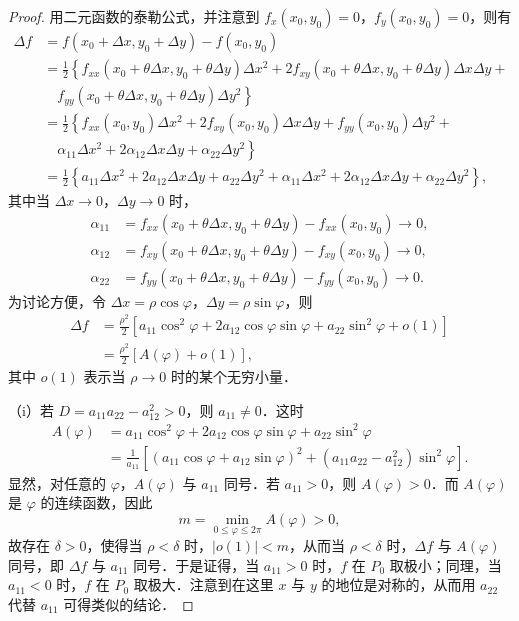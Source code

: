 \begin{proof}
用二元函数的泰勒公式，并注意到 $f_{x}(x_{0},y_{0})=0$，$f_{y}(x_{0},y_{0})=0$，则有
\[
\begin{aligned}
\Delta f&=f(x_{0}+\Delta x,y_{0}+\Delta y)-f(x_{0},y_{0})\\
&=\frac{1}{2}\left\{f_{xx}(x_{0}+\theta\Delta x,y_{0}+\theta\Delta y)\Delta x^{2}+2f_{xy}(x_{0}+\theta\Delta x,y_{0}+\theta\Delta y)\Delta x\Delta y+\right.\\
&\quad\left.f_{yy}(x_{0}+\theta\Delta x,y_{0}+\theta\Delta y)\Delta y^{2}\right\}\\
&=\frac{1}{2}\left\{f_{xx}(x_{0},y_{0})\Delta x^{2}+2f_{xy}(x_{0},y_{0})\Delta x\Delta y+f_{yy}(x_{0},y_{0})\Delta y^{2}+\right.\\
&\quad\left.\alpha_{11}\Delta x^{2}+2\alpha_{12}\Delta x\Delta y+\alpha_{22}\Delta y^{2}\right\}\\
&=\frac{1}{2}\left\{a_{11}\Delta x^{2}+2a_{12}\Delta x\Delta y+a_{22}\Delta y^{2}+\alpha_{11}\Delta x^{2}+2\alpha_{12}\Delta x\Delta y+\alpha_{22}\Delta y^{2}\right\},
\end{aligned}
\]
其中当 $\Delta x\to0$，$\Delta y\to0$ 时，
\[
\begin{aligned}
\alpha_{11}&=f_{xx}(x_{0}+\theta\Delta x,y_{0}+\theta\Delta y)-f_{xx}(x_{0},y_{0})\to0,\\
\alpha_{12}&=f_{xy}(x_{0}+\theta\Delta x,y_{0}+\theta\Delta y)-f_{xy}(x_{0},y_{0})\to0,\\
\alpha_{22}&=f_{yy}(x_{0}+\theta\Delta x,y_{0}+\theta\Delta y)-f_{yy}(x_{0},y_{0})\to0.
\end{aligned}
\]
为讨论方便，令 $\Delta x=\rho\cos\varphi$，$\Delta y=\rho\sin\varphi$，则
\[
\begin{aligned}
\Delta f&=\frac{\rho^{2}}{2}\left[a_{11}\cos^{2}\varphi+2a_{12}\cos\varphi\sin\varphi+a_{22}\sin^{2}\varphi+o(1)\right]\\
&=\frac{\rho^{2}}{2}\left[A(\varphi)+o(1)\right],
\end{aligned}
\]
其中 $o(1)$ 表示当 $\rho\to0$ 时的某个无穷小量．

（i）若 $D=a_{11}a_{22}-a_{12}^{2}>0$，则 $a_{11}\neq0$．这时
\begin{equation}
\begin{aligned}
A(\varphi)&=a_{11}\cos^{2}\varphi+2a_{12}\cos\varphi\sin\varphi+a_{22}\sin^{2}\varphi\\
&=\frac{1}{a_{11}}\left[\left(a_{11}\cos\varphi+a_{12}\sin\varphi\right)^{2}+\left(a_{11}a_{22}-a_{12}^{2}\right)\sin^{2}\varphi\right].
\end{aligned}
\tag{3}
\end{equation}
显然，对任意的 $\varphi$，$A(\varphi)$ 与 $a_{11}$ 同号．若 $a_{11}>0$，则 $A(\varphi)>0$．而 $A(\varphi)$ 是 $\varphi$ 的连续函数，因此
\[
m=\min_{0\leqslant\varphi\leqslant 2\pi}A(\varphi)>0,
\]
故存在 $\delta>0$，使得当 $\rho<\delta$ 时，$\left|o(1)\right|<m$，从而当 $\rho<\delta$ 时，$\Delta f$ 与 $A(\varphi)$ 同号，即 $\Delta f$ 与 $a_{11}$ 同号．于是证得，当 $a_{11}>0$ 时，$f$ 在 $P_{0}$ 取极小；同理，当 $a_{11}<0$ 时，$f$ 在 $P_{0}$ 取极大．注意到在这里 $x$ 与 $y$ 的地位是对称的，从而用 $a_{22}$ 代替 $a_{11}$ 可得类似的结论．


\end{proof}
